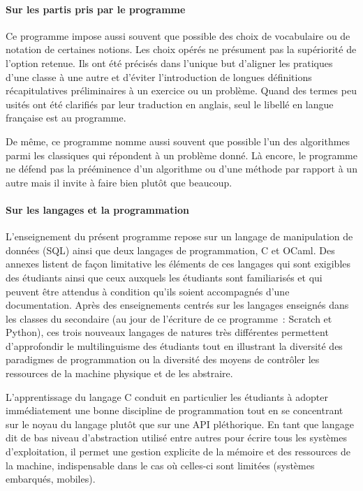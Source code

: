 \paragraph{Sur les partis pris par le programme} 
Ce programme impose aussi souvent que possible des choix de vocabulaire ou de notation de certaines notions. Les choix opérés ne présument pas la supériorité de l'option retenue. Ils ont été précisés dans l'unique but d'aligner les pratiques d'une classe à une autre et d'éviter l'introduction de longues définitions récapitulatives préliminaires à un exercice ou un problème. 
Quand des termes peu usités ont été clarifiés par leur traduction en anglais, seul le libellé en langue française est au programme.

De même, ce programme nomme aussi souvent que possible l'un des algorithmes parmi les classiques qui répondent à un problème donné. Là encore, le programme ne défend pas la prééminence d'un algorithme ou d'une méthode par rapport à un autre mais il invite à faire bien plutôt que beaucoup.

\paragraph{Sur les langages et la programmation} L'enseignement du présent programme repose sur un langage de manipulation de données (SQL) ainsi que deux langages de programmation, C et OCaml. Des annexes listent de façon limitative les éléments de ces langages qui sont exigibles des étudiants ainsi que ceux auxquels les étudiants sont familiarisés et qui peuvent être attendus à condition qu'ils soient accompagnés d'une documentation. Après des enseignements centrés sur les langages enseignés dans les classes du secondaire (au jour de l'écriture de ce programme~: Scratch et Python), ces trois nouveaux langages de natures très différentes permettent d'approfondir le multilinguisme des étudiants tout en illustrant la diversité des paradigmes de programmation ou la diversité des moyens de contrôler les ressources de la machine physique et de les abstraire. 

L'apprentissage du langage C conduit en particulier les étudiants à adopter immédiatement une bonne discipline de programmation tout en se concentrant sur le noyau du langage plutôt que sur une API pléthorique. En tant que langage dit de bas niveau d'abstraction utilisé entre autres pour écrire tous les systèmes d'exploitation, il permet une gestion explicite de la mémoire et des ressources de la machine, indispensable dans le cas où celles-ci sont limitées (systèmes embarqués, mobiles). 

